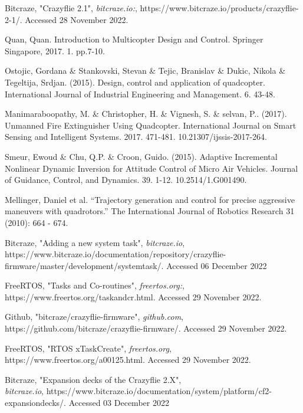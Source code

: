 \documentclass[10pt, a4paper]{article}
\begin{document}
\begin{thebibliography}{10}

    Bitcraze, "Crazyflie 2.1",
    \textit{bitcraze.io:},
    https://www.bitcraze.io/products/crazyflie-2-1/.
    Accessed 28 November 2022.

    Quan, Quan. Introduction to Multicopter Design and Control. Springer Singapore, 2017. 1. pp.7-10.

    Ostojic, Gordana \& Stankovski, Stevan \& Tejic, Branislav \& Dukic, Nikola \& Tegeltija, Srdjan. (2015). Design, control and application of quadcopter. International Journal of Industrial Engineering and Management. 6. 43-48. 

    Manimaraboopathy, M. \& Christopher, H. \& Vignesh, S. \& selvan, P.. (2017). Unmanned Fire Extinguisher Using Quadcopter. International Journal on Smart Sensing and Intelligent Systems. 2017. 471-481. 10.21307/ijssis-2017-264.

    Smeur, Ewoud \& Chu, Q.P. \& Croon, Guido. (2015). Adaptive Incremental Nonlinear Dynamic Inversion for Attitude Control of Micro Air Vehicles. Journal of Guidance, Control, and Dynamics. 39. 1-12. 10.2514/1.G001490. 

    Mellinger, Daniel et al. “Trajectory generation and control for precise aggressive maneuvers with quadrotors.” The International Journal of Robotics Research 31 (2010): 664 - 674.
    
    Bitcraze, "Adding a new system task",
    \textit{bitcraze.io},
    https://www.bitcraze.io/documentation/repository/crazyflie-firmware/master/development/systemtask/.
    Accessed 06 December 2022
    
    FreeRTOS, "Tasks and Co-routines",
    \textit{freertos.org:},
    https://www.freertos.org/taskandcr.html.
    Accessed 29 November 2022.
    
    Github, "bitcraze/crazyflie-firmware",
    \textit{github.com},
    https://github.com/bitcraze/crazyflie-firmware/.
    Accessed 29 November 2022.

    FreeRTOS, "RTOS xTaskCreate",
    \textit{freertos.org},
    https://www.freertos.org/a00125.html.
    Accessed 29 November 2022.
    
    Bitcraze, "Expansion decks of the Crazyflie 2.X",\\
    \textit{bitcraze.io},
    https://www.bitcraze.io/documentation/system/platform/cf2-expansiondecks/.
    Accessed 03 December 2022

\end{thebibliography}
\clearpage
\end{document}
